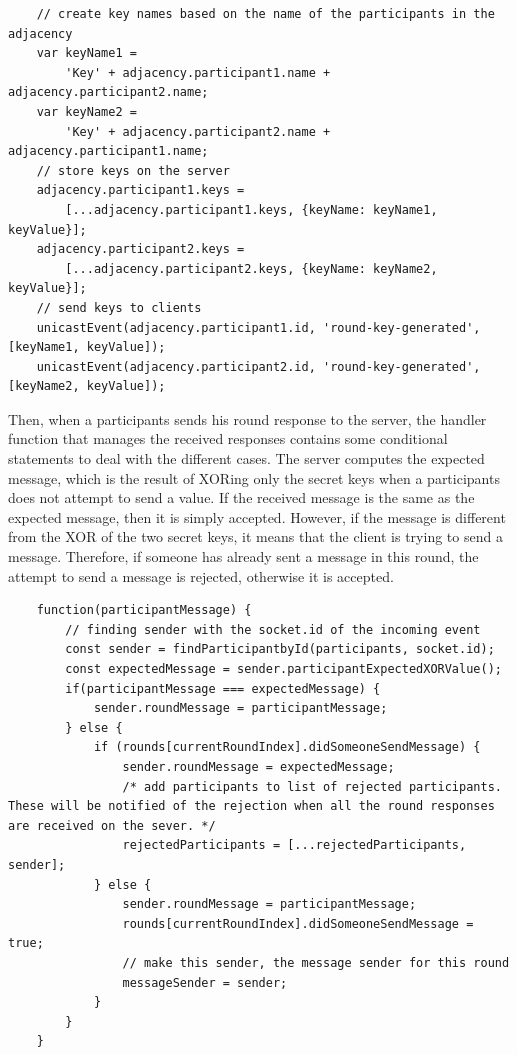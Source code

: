 \begin{lstlisting}
    // create key names based on the name of the participants in the adjacency
    var keyName1 = 
        'Key' + adjacency.participant1.name + adjacency.participant2.name;
    var keyName2 = 
        'Key' + adjacency.participant2.name + adjacency.participant1.name;
    // store keys on the server
    adjacency.participant1.keys = 
        [...adjacency.participant1.keys, {keyName: keyName1, keyValue}];
    adjacency.participant2.keys = 
        [...adjacency.participant2.keys, {keyName: keyName2, keyValue}];
    // send keys to clients
    unicastEvent(adjacency.participant1.id, 'round-key-generated', [keyName1, keyValue]);
    unicastEvent(adjacency.participant2.id, 'round-key-generated', [keyName2, keyValue]);
\end{lstlisting}


Then, when a participants sends his round response to the server, the handler function that manages the received responses contains some conditional statements to deal with the different cases. The server computes the expected message, which is the result of XORing only the secret keys when a participants does not attempt to send a value. If the received message is the same as the expected message, then it is simply accepted. However, if the message is different from the XOR of the two secret keys, it means that the client is trying to send a message. Therefore, if someone has already sent a message in this round, the attempt to send a message is rejected, otherwise it is accepted.

\begin{lstlisting}
    function(participantMessage) {
        // finding sender with the socket.id of the incoming event
        const sender = findParticipantbyId(participants, socket.id);
        const expectedMessage = sender.participantExpectedXORValue();
        if(participantMessage === expectedMessage) {
            sender.roundMessage = participantMessage;
        } else {
            if (rounds[currentRoundIndex].didSomeoneSendMessage) {
                sender.roundMessage = expectedMessage;
                /* add participants to list of rejected participants. These will be notified of the rejection when all the round responses are received on the sever. */
                rejectedParticipants = [...rejectedParticipants, sender];
            } else {
                sender.roundMessage = participantMessage;
                rounds[currentRoundIndex].didSomeoneSendMessage = true;
                // make this sender, the message sender for this round
                messageSender = sender;
            }
        }
    }
\end{lstlisting}

